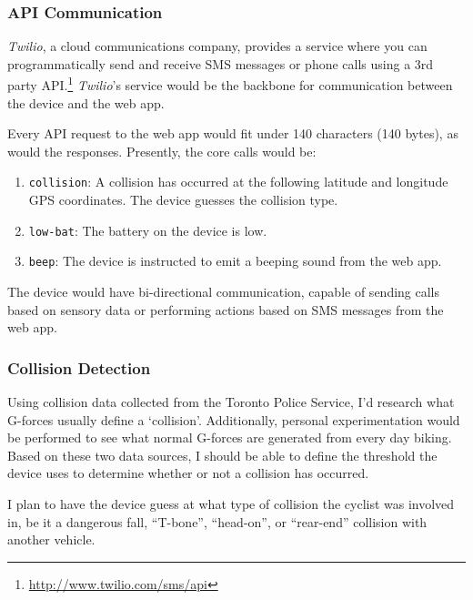 \documentclass[titlepage]{article}
\begin{document}
\subsubsection{API Communication}
{\em Twilio}, a cloud communications company, provides a service where you can programmatically send and receive SMS messages or phone calls using a 3rd party API.\footnote{\url{http://www.twilio.com/sms/api}} {\em Twilio}'s service would be the backbone for communication between the device and the web app.

Every API request to the web app would fit under 140 characters (140 bytes), as would the responses. Presently, the core calls would be:

\begin{enumerate}
	\item {\tt collision}: A collision has occurred at the following latitude and longitude GPS coordinates. The device guesses the collision type.
	\item {\tt low-bat}: The battery on the device is low.
	\item {\tt beep}: The device is instructed to emit a beeping sound from the web app.
\end{enumerate}

The device would have bi-directional communication, capable of sending calls based on sensory data or performing actions based on SMS messages from the web app.

\subsubsection{Collision Detection}
Using collision data collected from the Toronto Police Service, I'd research what G-forces usually define a `collision'. Additionally, personal experimentation would be performed to see what normal G-forces are generated from every day biking. Based on these two data sources, I should be able to define the threshold the device uses to determine whether or not a collision has occurred.

I plan to have the device guess at what type of collision the cyclist was involved in, be it a dangerous fall, ``T-bone'', ``head-on'', or ``rear-end'' collision with another vehicle.
\end{document}
